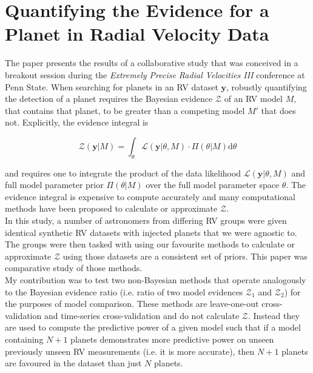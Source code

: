 \section{Quantifying the Evidence for a Planet in Radial Velocity Data
  \citep{nelson18}}
The paper presents the results of a collaborative study that was conceived in
a breakout session during the \emph{Extremely Precise Radial Velocities III}
conference at Penn State. When searching for planets in an RV dataset
$\mathbf{y}$, robustly 
quantifying the detection of a planet requires the Bayesian evidence
$\mathcal{Z}$ of an RV model $M$, that contains that planet, to
be greater than a competing model $M'$ that does not. Explicitly, the evidence
integral is

\begin{equation}
  \mathcal{Z}(\mathbf{y}|M) = \int_{\theta} \mathcal{L}(\mathbf{y}|\theta,M)
  \cdot \Pi(\theta|M) \text{d} \theta
\end{equation}

\noindent and requires one to integrate the product of the data likelihood
$\mathcal{L}(\mathbf{y}|\theta,M)$ and full model parameter prior
$\Pi(\theta|M)$ over the full model parameter space $\theta$.
The evidence integral is expensive to compute accurately and many computational
methods have been proposed to calculate or approximate $\mathcal{Z}$. \\

In this study, a number of astronomers from differing RV groups were given
identical synthetic RV
datasets with injected planets that we were agnostic to. The groups were then
tasked with using our favourite methods to calculate or approximate
$\mathcal{Z}$ using those datasets are a consistent set of priors. This paper
was comparative study of those methods. \\

My contribution was to test two non-Bayesian methods that operate
analogously to the Bayesian evidence ratio (i.e. ratio of two model evidences
$\mathcal{Z}_1$ and $\mathcal{Z}_2$) for the purposes of model comparison. These
methods are leave-one-out cross-validation and time-series cross-validation
and do not calculate $\mathcal{Z}$. Instead they are used to compute the
predictive power of a given model such that if a model containing $N+1$ planets
demonstrates more predictive power on unseen previously unseen RV measurements
(i.e. it is more accurate), then $N+1$ planets are favoured in the dataset
than just $N$ planets. 

